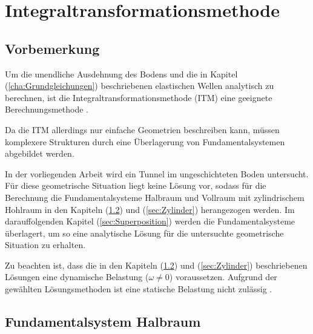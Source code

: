 \chapter{Integraltransformationsmethode}
\label{cha:ITM}


\section{Vorbemerkung}
\label{sec:Vorbemerkung_ITM}

Um die unendliche Ausdehnung des Bodens und die in Kapitel (\ref{cha:Grundgleichungen}) beschriebenen elastischen Wellen analytisch zu berechnen, ist die Integraltransformationsmethode (ITM) eine geeignete Berechnungsmethode \citep{Mueller2007}.

Da die ITM allerdings nur einfache Geometrien beschreiben kann, müssen komplexere Strukturen durch eine Überlagerung von Fundamentalsystemen abgebildet werden. 

In der vorliegenden Arbeit wird ein Tunnel im ungeschichteten Boden untersucht.
Für diese geometrische Situation liegt keine Lösung vor, sodass für die Berechnung die Fundamentalsysteme Halbraum und Vollraum mit zylindrischem Hohlraum in den Kapiteln (\ref{sec:Halbraum}) und (\ref{sec:Zylinder}) herangezogen werden.
Im darauffolgenden Kapitel (\ref{sec:Superposition}) werden die Fundamentalsysteme überlagert, um so eine analytische Lösung für die untersuchte geometrische Situation zu erhalten.

Zu beachten ist, dass die in den Kapiteln (\ref{sec:Halbraum}) und (\ref{sec:Zylinder}) beschriebenen Lösungen eine dynamische Belastung  (\(\omega \neq 0\)) voraussetzen. Aufgrund der gewählten Lösungsmethoden ist eine statische Belastung nicht zulässig \citep{Fruehe2010}.

\section{Fundamentalsystem Halbraum}
\label{sec:Halbraum}

